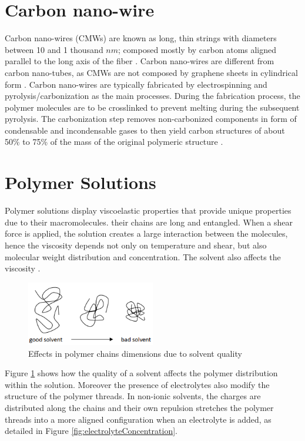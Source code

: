 \section{Carbon nano-wire}
Carbon nano-wires (CMWs) are known as long, thin strings with diameters between 10 and 1 thousand $n m$; composed mostly by carbon atoms aligned parallel to the long axis of the fiber \cite{Nataraj2012}. Carbon nano-wires are different from carbon nano-tubes, as CMWs are not composed by graphene sheets in cylindrical form \cite{Nataraj2012}. Carbon nano-wires are typically fabricated by electrospinning and pyrolysis/carbonization as the main processes. During the fabrication process, the polymer molecules are to be crosslinked to prevent melting during the subsequent pyrolysis. The carbonization step removes non-carbonized components in form of condensable and incondensable gases \cite{Basu2018} to then yield carbon structures of about 50\% to 75\% of the mass of the original polymeric structure \cite{Nataraj2012}.

\section{Polymer Solutions}
Polymer solutions display viscoelastic properties that provide unique properties due to their macromolecules. their chains are long and entangled. When a shear force is applied, the solution creates a large interaction between the molecules, hence the viscosity depends not only on temperature and shear, but also molecular weight distribution and concentration. The solvent also affects the viscosity \cite{Flores2017, Huang2003, Baumgarten1971}.

\begin{figure}[th]
\centering
\includegraphics[width=0.50\textwidth]{./Figures/goodbadsolvent.png}
\decoRule
\caption[Effects in polymer chains dimensions due to solvent quality]{Effects in polymer chains dimensions due to solvent quality \cite{Flores2017}}
\label{fig:goodbadsolvent}
\end{figure}

Figure \ref{fig:goodbadsolvent} shows how the quality of a solvent affects the polymer distribution within the solution. Moreover the presence of electrolytes also modify the structure of the polymer threads. In non-ionic solvents, the charges are distributed along the chains and their own repulsion stretches the polymer threads into a more aligned configuration when an electrolyte is added, as detailed in Figure \ref{fig:electrolyteConcentration}.

